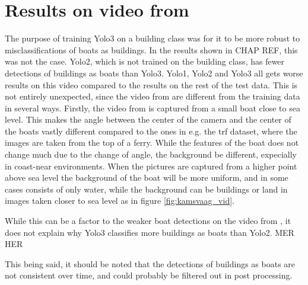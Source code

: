\section{Results on video from \citep{Kamsvag2018}}

The purpose of training Yolo3 on a building class was for it to be more robust to misclassifications of boats as buildings. In the results shown in CHAP REF, this was not the case. Yolo2, which is not trained on the building class, has fewer detections of buildings as boats than Yolo3. Yolo1, Yolo2 and Yolo3 all gets worse results on this video compared to the results on the rest of the test data. This is not entirely unexpected, since the video from \citep{Kamsvag2018} are different from the training data in several ways. Firstly, the video from \citep{Kamsvag2018} is captured from a small boat close to sea level. This makes the angle between the center of the camera and the center of the boats vastly different compared to the ones in e.g. the trf dataset, where the images are taken from the top of a ferry. While the features of the boat does not change much due to the change of angle, the background be different, expecially in coast-near environments. When the pictures are captured from a higher point above sea level the background of the boat will be more uniform, and in some cases consists of only water, while the background can be buildings or land in images taken closer to sea level as in figure \ref{fig:kamsvaag_vid}. 

\vspace{3mm}

While this can be a factor to the weaker boat detections on the video from \citep{Kamsvag2018}, it does not explain why Yolo3 classifies more buildings as boats than Yolo2. MER HER

\vspace{3mm}

This being said, it should be noted that the detections of buildings as boats are not consistent over time, and could probably be filtered out in post processing.